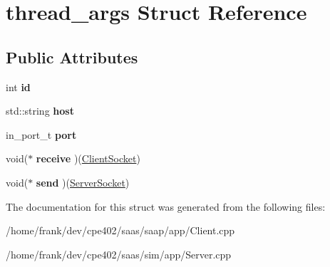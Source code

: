 \hypertarget{structthread__args}{}\section{thread\+\_\+args Struct Reference}
\label{structthread__args}
\subsection*{Public Attributes}
\begin{DoxyCompactItemize}
\item 
\hypertarget{structthread__args_a6322b3468fd88f8f49977a6439e9f352}{}int {\bfseries id}\label{structthread__args_a6322b3468fd88f8f49977a6439e9f352}

\item 
\hypertarget{structthread__args_a2993a11951278a8e5277b45ac9547d00}{}std\+::string {\bfseries host}\label{structthread__args_a2993a11951278a8e5277b45ac9547d00}

\item 
\hypertarget{structthread__args_aec0f2f19bebb0641a7a635ad70376db3}{}in\+\_\+port\+\_\+t {\bfseries port}\label{structthread__args_aec0f2f19bebb0641a7a635ad70376db3}

\item 
\hypertarget{structthread__args_a44ed1c0214dc37f162e77dbe0f9dd5fb}{}void($\ast$ {\bfseries receive} )(\hyperlink{class_client_socket}{Client\+Socket})\label{structthread__args_a44ed1c0214dc37f162e77dbe0f9dd5fb}

\item 
\hypertarget{structthread__args_a32fa5ab6ec80d4ee564930d62027fd93}{}void($\ast$ {\bfseries send} )(\hyperlink{class_server_socket}{Server\+Socket})\label{structthread__args_a32fa5ab6ec80d4ee564930d62027fd93}

\end{DoxyCompactItemize}


The documentation for this struct was generated from the following files\+:\begin{DoxyCompactItemize}
\item 
/home/frank/dev/cpe402/saas/saap/app/Client.\+cpp\item 
/home/frank/dev/cpe402/saas/sim/app/Server.\+cpp\end{DoxyCompactItemize}
